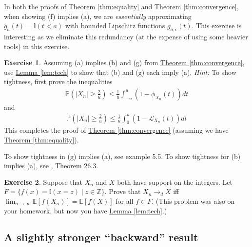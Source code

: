 \documentclass{article}
\theoremstyle{definition}
\newtheorem{exercise}{Exercise}
\renewcommand{\P}{\mathbb P}
\newcommand{\E}{\mathbb E}
\newcommand{\1}{\mathbb I}
\newcommand{\Z}{\mathbb Z}
\newcommand{\thmhref}[1]{\hyperref[#1]{Theorem \ref{#1}}}
\newcommand{\lemhref}[1]{\hyperref[#1]{Lemma \ref{#1}}}
\begin{document}
In both the proofs of \thmhref{thm:equality} and
\thmhref{thm:convergence}, when showing (f) implies (a), we are
\emph{essentially} approximating $g_a(t) = \1(t<a)$ with bounded
Lipschitz functions $g_{a,\epsilon}(t)$.  This exercise is interesting
as we eliminate this redundancy (at the expense of using some heavier
tools) in this exercise.
\begin{exercise}
  Assuming (a) implies (b) and (g) from \thmhref{thm:convergence}, use
  \lemhref{lem:tech} to show that (b) and (g) each imply (a). \emph{Hint:} To
  show tightness, first prove the inequalities
  \begin{align*}
    \P\left(|X_n| \geq \frac 2 u\right) \leq \frac{1}{u} \int_{-u}^u (1-  \phi_{X_n}(t))dt
  \end{align*}
  and
  \begin{align*}
    \P\left(|X_n| \geq \frac 2 u\right) \leq \frac{1}{u} \int_{0}^u (1-  \mathcal L_{X_n}(t))dt
  \end{align*}
  This completes the proof of \thmhref{thm:convergence} (assuming we have \thmhref{thm:equality}).
\end{exercise}
To show tightness in (g) implies (a), see \cite{billingsley2009convergence} example 5.5.  To show tightness for (b) implies (a), see \cite{billingsley2012probability}, Theorem 26.3.
\begin{exercise}
  Suppose that $X_n$ and $X$ both have support on the integers.  Let
  $F = \{f(x) = \1(x = z) \mid z \in \Z\}$.  Prove that $X_n \to_d X$
  iff $\lim_{n \to \infty} \E[f(X_n)] = \E[f(X)]$ for all $f \in F$.
  (This problem was also on your homework, but now you have \lemhref{lem:tech}.)
\end{exercise}

\subsection{A slightly stronger ``backward'' result}
\end{document}
